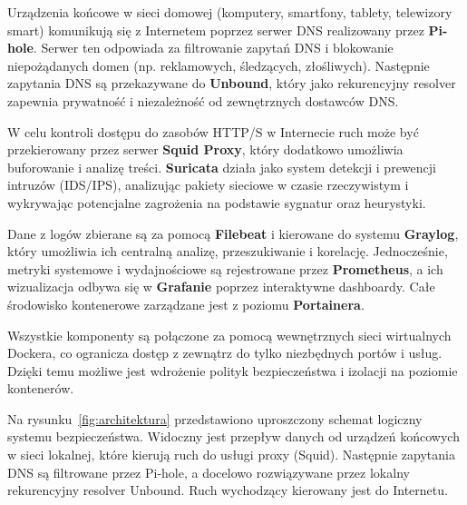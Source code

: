 \documentclass[
    left=2.5cm,         %
    right=2.5cm,        %
    top=2.5cm,          %
    bottom=3cm,         %
    bindingoffset=6mm,  %
    nohyphenation=true %
]{eiti/eiti-thesis} %
\begin{document}
Urządzenia końcowe w sieci domowej (komputery, smartfony, tablety, telewizory smart) komunikują się z Internetem poprzez serwer DNS realizowany przez \textbf{Pi-hole}. Serwer ten odpowiada za filtrowanie zapytań DNS i blokowanie niepożądanych domen (np. reklamowych, śledzących, złośliwych). Następnie zapytania DNS są przekazywane do \textbf{Unbound}, który jako rekurencyjny resolver zapewnia prywatność i niezależność od zewnętrznych dostawców DNS.

W celu kontroli dostępu do zasobów HTTP/S w Internecie ruch może być przekierowany przez serwer \textbf{Squid Proxy}, który dodatkowo umożliwia buforowanie i analizę treści. \textbf{Suricata} działa jako system detekcji i prewencji intruzów (IDS/IPS), analizując pakiety sieciowe w czasie rzeczywistym i wykrywając potencjalne zagrożenia na podstawie sygnatur oraz heurystyki.

Dane z logów zbierane są za pomocą \textbf{Filebeat} i kierowane do systemu \textbf{Graylog}, który umożliwia ich centralną analizę, przeszukiwanie i korelację. Jednocześnie, metryki systemowe i wydajnościowe są rejestrowane przez \textbf{Prometheus}, a ich wizualizacja odbywa się w \textbf{Grafanie} poprzez interaktywne dashboardy. Całe środowisko kontenerowe zarządzane jest z poziomu \textbf{Portainera}.

Wszystkie komponenty są połączone za pomocą wewnętrznych sieci wirtualnych Dockera, co ogranicza dostęp z zewnątrz do tylko niezbędnych portów i usług. Dzięki temu możliwe jest wdrożenie polityk bezpieczeństwa i izolacji na poziomie kontenerów. 

Na rysunku~\ref{fig:architektura} przedstawiono uproszczony schemat logiczny systemu bezpieczeństwa. Widoczny jest przepływ danych od urządzeń końcowych w sieci lokalnej, które kierują ruch do usługi proxy (Squid). Następnie zapytania DNS są filtrowane przez Pi-hole, a docelowo rozwiązywane przez lokalny rekurencyjny resolver Unbound. Ruch wychodzący kierowany jest do Internetu. 
\end{document}
